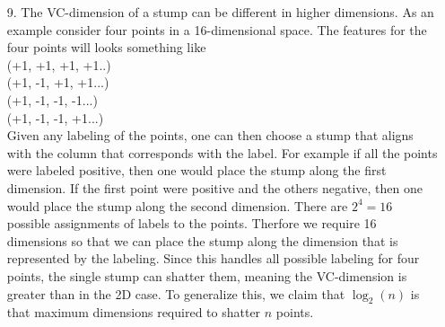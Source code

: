 \documentclass{article}
\begin{document}
\begin{enumerate}
\newpage

\item[9.]	
	The VC-dimension of a stump can be different in higher dimensions. As an example consider four points in a 16-dimensional space. The features for the four points will looks something like\\
	
	(+1, +1, +1, +1..)\\
	(+1, -1, +1, +1...)\\
	(+1, -1, -1, -1...)\\
	(+1, -1, -1, +1...)\\
	
	Given any labeling of the points, one can then choose a stump that aligns with the column that corresponds with the label. For example if all the points were labeled positive, then one would place the stump along the first dimension. If the first point were positive and the others negative, then one would place the stump along the second dimension. There are $2^{4} = 16$ possible assignments of labels to the points. Therfore we require 16 dimensions so that we can place the stump along the dimension that is represented by the labeling. Since this handles all possible labeling for four points, the single stump can shatter them, meaning the VC-dimension is greater than in the 2D case. To generalize this, we claim that $\log_2(n)$ is that maximum dimensions required to shatter $n$ points.

\end{enumerate}
\end{document}
